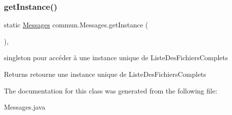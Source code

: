 \subsubsection{\texorpdfstring{get\+Instance()}{getInstance()}}
{\footnotesize\ttfamily static \hyperlink{classcommun_1_1Messages}{Messages} commun.\+Messages.\+get\+Instance (\begin{DoxyParamCaption}{ }\end{DoxyParamCaption})\hspace{0.3cm}{\ttfamily [inline]}, {\ttfamily [static]}}



singleton pour accéder à une instance unique de Liste\+Des\+Fichiers\+Complets 

\begin{DoxyReturn}{Returns}
retourne une instance unique de Liste\+Des\+Fichiers\+Complets 
\end{DoxyReturn}


The documentation for this class was generated from the following file\+:\begin{DoxyCompactItemize}
\item 
Messages.\+java\end{DoxyCompactItemize}
